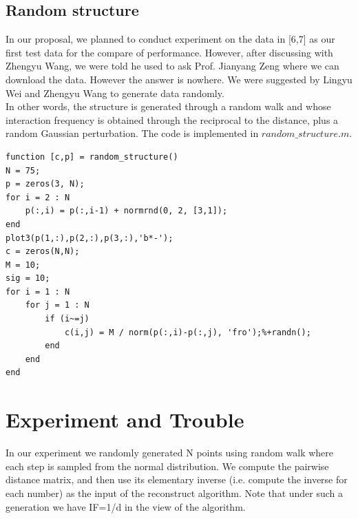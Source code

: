 \documentclass[12pt]{article} %
\begin{document}
\subsection{Random structure}
In our proposal, we planned to conduct experiment on the data in [6,7] as our first test data for the compare of performance. However, after discussing with Zhengyu Wang, we were told he used to ask Prof. Jianyang Zeng where we can download the data. However the answer is nowhere. We were suggested by Lingyu Wei and Zhengyu Wang to generate data randomly. \\
In other words, the structure is generated through a random walk and whose interaction frequency is obtained through the reciprocal to the distance, plus a random Gaussian perturbation. The code is implemented in $random\_structure.m$.
\begin{lstlisting}
function [c,p] = random_structure()
N = 75;
p = zeros(3, N);
for i = 2 : N
    p(:,i) = p(:,i-1) + normrnd(0, 2, [3,1]);
end
plot3(p(1,:),p(2,:),p(3,:),'b*-');
c = zeros(N,N);
M = 10;
sig = 10;
for i = 1 : N
    for j = 1 : N
        if (i~=j)
            c(i,j) = M / norm(p(:,i)-p(:,j), 'fro');%+randn();
        end
    end
end
\end{lstlisting}


\section{Experiment and Trouble}

In our experiment we randomly generated N points using random walk where each step is sampled from the normal distribution. We compute the pairwise distance matrix, and then use its elementary inverse (i.e. compute the inverse for each number) as the input of the reconstruct algorithm. Note that under such a generation we have IF=1/d in the view of the algorithm.
\end{document}
